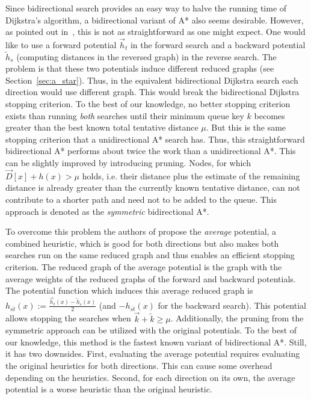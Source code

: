 \documentclass[manuscript,review]{acmart}
\begin{document}
Since bidirectional search provides an easy way to halve the running time of Dijkstra's algorithm, a bidirectional variant of A* also seems desirable.
However, as pointed out in~\cite{gh-cspas-05}, this is not as straightforward as one might expect.
One would like to use a forward potential $\overrightarrow{h}_t$ in the forward search and a backward potential $\overleftarrow{h}_s$ (computing distances in the reversed graph) in the reverse search.
The problem is that these two potentials induce different reduced graphs (see Section~\ref{sec:a_star}).
Thus, in the equivalent bidirectional Dijkstra search each direction would use different graph.
This would break the bidirectional Dijkstra stopping criterion.
To the best of our knowledge, no better stopping criterion exists than running \emph{both} searches until their minimum queue key $k$ becomes greater than the best known total tentative distance $\mu$.
But this is the same stopping criterion that a unidirectional A* search has.
Thus, this straightforward bidirectional A* performs about twice the work than a unidirectional A*.
This can be slightly improved by introducing pruning.
Nodes, for which $\overrightarrow{D}[x] + h(x) > \mu$ holds, i.e. their distance plus the estimate of the remaining distance is already greater than the currently known tentative distance, can not contribute to a shorter path and need not to be added to the queue.
This approach is denoted as the \emph{symmetric} bidirectional A*.

To overcome this problem the authors of propose the \emph{average} potential, a combined heuristic, which is good for both directions but also makes both searches run on the same reduced graph and thus enables an efficient stopping criterion.
The reduced graph of the average potential is the graph with the average weights of the reduced graphs of the forward and backward potentials.
The potential function which induces this average reduced graph is $h_{\overline{st}}(x) := \frac{\overrightarrow{h}_t(x) - \overleftarrow{h}_s(x)}{2}$ (and $-h_{\overline{st}}(x)$ for the backward search).
This potential allows stopping the searches when $\overrightarrow{k} + \overleftarrow{k} \geq \mu$.
Additionally, the pruning from the symmetric approach can be utilized with the original potentials.
To the best of our knowledge, this method is the fastest known variant of bidirectional A*.
Still, it has two downsides.
First, evaluating the average potential requires evaluating the original heuristics for both directions.
This can cause some overhead depending on the heuristics.
Second, for each direction on its own, the average potential is a worse heuristic than the original heuristic.
\end{document}
